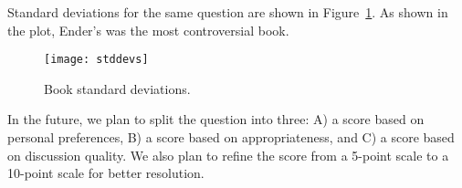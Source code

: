 \documentclass{article}
\newcommand{\PLOT}[1]{Figure~\ref{plot:#1}}
\begin{document}
Standard deviations for the same question are shown in \PLOT{stddevs}.  As shown in the plot, Ender's was the most controversial book.

\begin{figure}
\texttt{[image: stddevs]}
\caption{Book standard deviations.
  \label{plot:stddevs}}
\end{figure}

In the future, we plan to split the question into three: A) a score based on personal preferences, B) a score based on appropriateness, and C) a score based on discussion quality.  We also plan to refine the score from a 5-point scale to a 10-point scale for better resolution.
\end{document}
